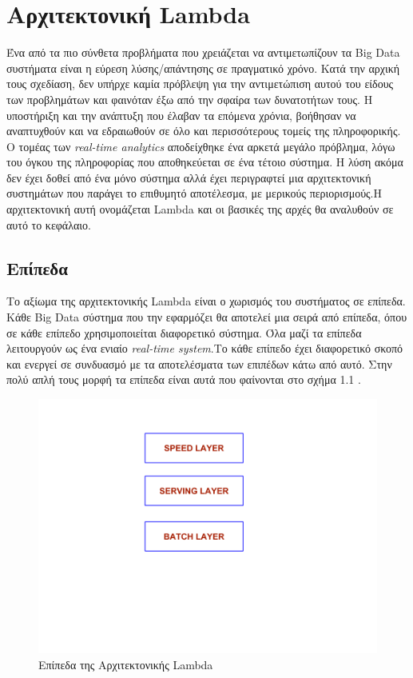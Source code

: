 \chapter{Αρχιτεκτονική Lambda}
Ένα από τα πιο σύνθετα προβλήματα που χρειάζεται να αντιμετωπίζουν τα Big Data συστήματα είναι η εύρεση λύσης/απάντησης σε πραγματικό χρόνο. Κατά την αρχική τους σχεδίαση, δεν υπήρχε καμία πρόβλεψη για την αντιμετώπιση αυτού του είδους των προβλημάτων και φαινόταν έξω από την σφαίρα των δυνατοτήτων τους. Η υποστήριξη και την ανάπτυξη που έλαβαν τα επόμενα χρόνια, βοήθησαν να αναπτυχθούν και να εδραιωθούν σε όλο και περισσότερους τομείς της πληροφορικής. Ο τομέας των \textit{real-time analytics} αποδείχθηκε ένα αρκετά μεγάλο πρόβλημα, λόγω του όγκου της πληροφορίας που αποθηκεύεται σε ένα τέτοιο σύστημα. Η λύση ακόμα δεν έχει δοθεί από ένα μόνο σύστημα αλλά έχει περιγραφτεί μια αρχιτεκτονική συστημάτων που παράγει το επιθυμητό αποτέλεσμα, με μερικούς περιορισμούς.Η αρχιτεκτονική αυτή ονομάζεται Lambda και οι βασικές της αρχές θα αναλυθούν σε αυτό το κεφάλαιο.

\section{Επίπεδα}
Το αξίωμα της αρχιτεκτονικής Lambda είναι ο χωρισμός του συστήματος σε επίπεδα. Κάθε Big Data σύστημα που την εφαρμόζει θα αποτελεί μια σειρά από επίπεδα, όπου σε κάθε επίπεδο χρησιμοποιείται διαφορετικό σύστημα. Όλα μαζί τα επίπεδα λειτουργούν ως ένα ενιαίο \textit{real-time system}.Το κάθε επίπεδο έχει διαφορετικό σκοπό και ενεργεί σε συνδυασμό με τα αποτελέσματα των επιπέδων κάτω από αυτό. Στην πολύ απλή τους μορφή τα επίπεδα είναι αυτά που φαίνονται στο σχήμα 1.1 .

\begin{figure}[t]
\caption{Επίπεδα της Αρχιτεκτονικής Lambda}
\includegraphics[width=14cm]{images/layers.png}
\centering
\end{figure}
\clearpage

